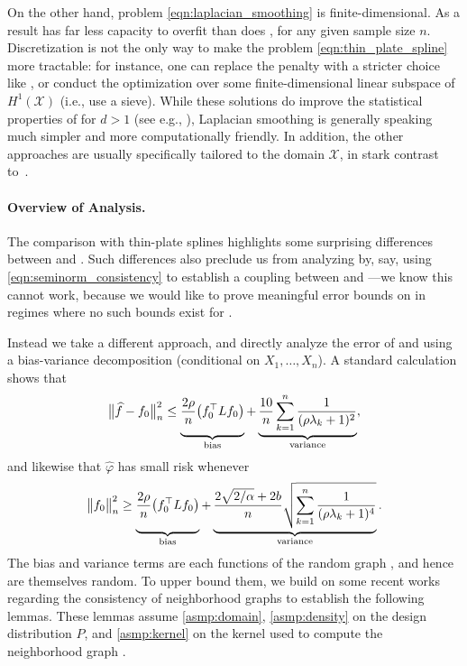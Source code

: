 \documentclass[twoside]{article}
\newcommand{\1}{\mathbf{1}}
\DeclareMathOperator*{\esssup}{ess\,sup}
\newcommand{\Xset}{\mathcal{X}}
\newcommand{\wt}[1]{\widetilde{#1}}
\newcommand{\wh}[1]{\widehat{#1}}
\theoremstyle{definition}
\theoremstyle{remark}
\begin{document}
On the other hand, problem \eqref{eqn:laplacian_smoothing} is finite-dimensional. As a result \smash{$\wh{f}$} has far less capacity to overfit than does \smash{$\wt{f}$}, for any given sample size $n$. Discretization is not the only way to make the problem \eqref{eqn:thin_plate_spline} more tractable: for instance, one can replace the penalty \smash{$\int_{\Xset} \|\nabla f(x)\|_2^2 \,dx$} with a stricter choice like \smash{$\esssup_{x \in \Xset} \|\nabla f(x)\|_2$}, or conduct the optimization over some finite-dimensional linear subspace of $H^1(\Xset)$ (i.e., use a sieve). While these solutions do improve the statistical properties of \smash{$\wt{f}$} for $d > 1$ (see e.g., \citet{birge1993,birge1998,vandergeer2000}), Laplacian smoothing is generally speaking much simpler and more computationally friendly. In addition, the other approaches are usually specifically tailored to the domain $\Xset$, in stark contrast to~\smash{$\wh{f}$}.

\paragraph{Overview of Analysis.}

The comparison with thin-plate splines highlights some surprising differences between \smash{$\wh{f}$} and \smash{$\wt{f}$}. Such differences also preclude us from analyzing \smash{$\wh{f}$} by, say, using \eqref{eqn:seminorm_consistency} to establish a coupling between \smash{$\wh{f}$} and \smash{$\wt{f}$}---we know this cannot work, because we would like to prove meaningful error bounds on \smash{$\wh{f}$} in regimes where no such bounds exist for \smash{$\wt{f}$}.

Instead we take a different approach, and directly analyze the error of \smash{$\wh{f}$} and \smash{$\wh{T}$} using a bias-variance decomposition (conditional on $X_1,\ldots,X_n$). A standard calculation shows that
\begin{equation*}
\bigl\|\wh{f} - f_0\bigr\|_n^2 \leq \underbrace{\vphantom{\sum_{k=1}^n}\frac{2\rho}{n} \bigl(f_0^\top L f_0\bigr)}_{\textrm{bias}} + \underbrace{\frac{10}{n} \sum_{k = 1}^{n} \frac{1}{(\rho \lambda_k + 1)^2}}_{\textrm{variance}},
\end{equation*}
and likewise that $\wh{\varphi}$ has small risk whenever
\begin{equation*}
\bigl\|f_0\bigr\|_n^2 \geq \underbrace{\vphantom{\sqrt{\sum_{k=1}^n}}\frac{2\rho}{n} \bigl(f_0^\top L f_0\bigr)}_{\textrm{bias}} + \underbrace{\frac{2\sqrt{2/\alpha} + 2b}{n} \sqrt{\sum_{k = 1}^{n} \frac{1}{(\rho \lambda_k + 1)^4}}}_{\textrm{variance}}.
\end{equation*}
The bias and variance terms are each functions of the random graph , and hence are themselves random. To upper bound them, we build on some recent works \citep{burago2014,trillos2019,calder2019} regarding the consistency of neighborhood graphs to establish the following lemmas. These lemmas assume \ref{asmp:domain}, \ref{asmp:density} on the design distribution $P$, and \ref{asmp:kernel} on the kernel used to compute the neighborhood graph . 
\end{document}
